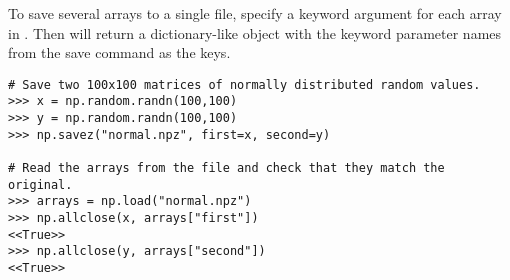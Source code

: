 To save several arrays to a single file, specify a keyword argument for each array in .
Then  will return a dictionary-like object with the keyword parameter names from the save command as the keys.

\begin{lstlisting}
# Save two 100x100 matrices of normally distributed random values.
>>> x = np.random.randn(100,100)
>>> y = np.random.randn(100,100)
>>> np.savez("normal.npz", first=x, second=y)

# Read the arrays from the file and check that they match the original.
>>> arrays = np.load("normal.npz")
>>> np.allclose(x, arrays["first"])
<<True>>
>>> np.allclose(y, arrays["second"])
<<True>>
\end{lstlisting}

\begin{comment}
\subsection*{Polynomials} %

The \li{np.poly1d} object represents a polynomial in NumPy.
The constructor is called with the coefficients of the desired polynomial.

\begin{lstlisting}
>>> poly = np.poly1d([3, 5, 1, 2, 0, 1])
>>> print(poly)
   5     4     3     2
3 x + 5 x + 1 x + 2 x + 1
\end{lstlisting}

The object \li{poly} represents the polynomial $3x^5+5x^4+x^3+2x^2+1$.
NumPy provides many functions to operate on \li{poly1d} objects (see \url{http://docs.scipy.org/doc/numpy/reference/routines.polynomials.polynomial.html}).

Recall that
\[
e^x = \sum_{n=0}^{\infty} \frac{x^n}{n!}.
\]
The following function evaluates the $N$th partial sum of this series at the value $a$.

\begin{lstlisting}
>>> from scipy.misc import factorial
>>> def exp(a, N=25):
...     """Construct an array in reverse order from n to 0."""
...     n = np.arange(N, -1, -1)
...     # Use broadcasting to compute coefficients
...     coeffs = 1. / factorial(n)
...     poly = np.poly1d(coeffs)        # Make a polynomial object.
...     return poly(a)
...
\end{lstlisting}

The last two lines can be condensed by using the following command:


\end{comment}
